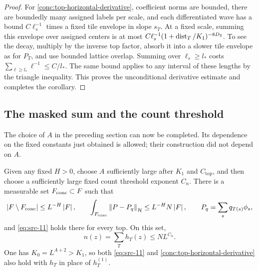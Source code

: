 \begin{proof}
For \eqref{conc:top-horizontal-derivative}, coefficient norms are
bounded, there are boundedly many assigned labels per scale, and
each differentiated wave has a bound $C\ell_s^{-1}$ times a fixed
tile envelope in slope $s_T$.  At a fixed scale, summing this envelope
over assigned centers is at most
$C\ell_s^{-1}(1+\operatorname{dist}_T/K_1)^{-8D_2}$.
To see the decay, multiply by the inverse top factor, absorb it into
a slower tile envelope as for $P_T$, and use bounded lattice overlap.
Summing over $\ell_s\geq l_*$ costs
$\sum_{\ell\geq l_*}\ell^{-1}\leq C/l_*$.
The same bound applies to any interval of these lengths by the
triangle inequality.  This proves the unconditional derivative
estimate and completes the corollary.
\end{proof}

\subsection{The masked sum and the count threshold}

The choice of $A$ in the preceding section can now be completed.
Its dependence on the fixed constants just obtained is allowed;
their construction did not depend on $A$.

\begin{proposition}\label{conc:mask-removal}
Given any fixed $H>0$, choose $A$ sufficiently large after $K_1$ and
$C_{\mathrm{top}}$, and then choose a sufficiently large fixed count
threshold exponent $C_n$.  There is a measurable set
$F_{\rm conc}\subset F$ such that
\[
 \left|F\setminus F_{\rm conc}\right|\leq L^{-H}\left|F\right|,
 \qquad
 \int_{F_{\rm conc}}\left\|P-P_q\right\|_{\mathcal H}
       \leq L^{-H}N\left|F\right|,
 \qquad P_q=\sum_sq_{T(s)}\phi_s,
\]
and \eqref{eq:src-11} holds there for every top.  On this set,
\begin{equation}\label{eq:src-12}
 n(z)=\sum_T h_T(z)\leq NL^{C_n}.
\end{equation}
One has $K_0=L^{A+2}>K_1$, so both
\eqref{eq:src-11} and \eqref{conc:top-horizontal-derivative} also hold
with $h_T$ in place of $h_T^{(1)}$.
\end{proposition}

